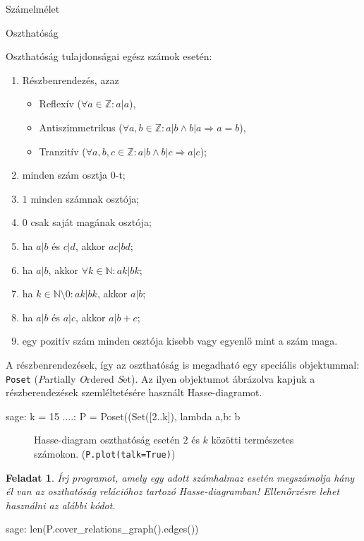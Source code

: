\documentclass{amsbook}
\theoremstyle{mystyle}
\newtheorem{exercise}{Feladat}[part]
\begin{document}
\begin{part}{Számelmélet}
\begin{section}{Oszthatóság}
  
  Oszthatóság tulajdonságai egész számok esetén:
  \begin{enumerate}
    \item Részbenrendezés, azaz
      \begin{itemize}
        \item Reflexív ($\forall a\in\mathbb{Z}: a|a$),
        \item Antiszimmetrikus 
          ($\forall a,b\in\mathbb{Z}: a|b\wedge b|a\Rightarrow a=b$),
        \item Tranzitív 
          ($\forall a,b,c\in\mathbb{Z}: a|b \wedge b|c \Rightarrow a|c$);
      \end{itemize}
    \item minden szám osztja $0$-t;
    \item $1$ minden számnak osztója;
    \item $0$ csak saját magának osztója;
    \item ha $a|b$ és $c|d$, akkor $ac|bd$;
    \item ha $a|b$, akkor $\forall k\in \mathbb{N}: ak|bk$;
    \item ha $k\in \mathbb{N}\setminus{0}:ak|bk$, akkor $a|b$;
    \item ha $a|b$ és $a|c$, akkor $a|b+c$;
    \item egy pozitív szám minden osztója kisebb vagy egyenlő mint a szám maga.
  \end{enumerate}

  A részbenrendezések, így az oszthatóság is megadható egy speciális objektummal:
  \texttt{Poset} (\emph{P}artially \emph{O}rdered \emph{S}et).
  Az ilyen objektumot ábrázolva kapjuk a részberendezések szemléltetésére
  használt Hasse-diagramot.
  \begin{sageexample}
    sage: k = 15
    ....: P = Poset((Set([2..k]), lambda a,b: b %
  \end{sageexample}
  \begin{figure}[h!]
    \centering
    \caption{Hasse-diagram oszthatóság esetén $2$ és $k$ közötti természetes
    számokon.  (\texttt{P.plot(talk=True)})}
  \end{figure}

  \begin{exercise} Írj programot, amely egy adott számhalmaz esetén megszámolja hány
    él van az oszthatóság relációhoz tartozó  Hasse-diagramban! Ellen\H orzésre lehet 
    használni az alábbi kódot.
  \end{exercise}
  \begin{sageexample}
    sage: len(P.cover_relations_graph().edges())
  \end{sageexample}


\end{section}
\end{part}
\end{document}
